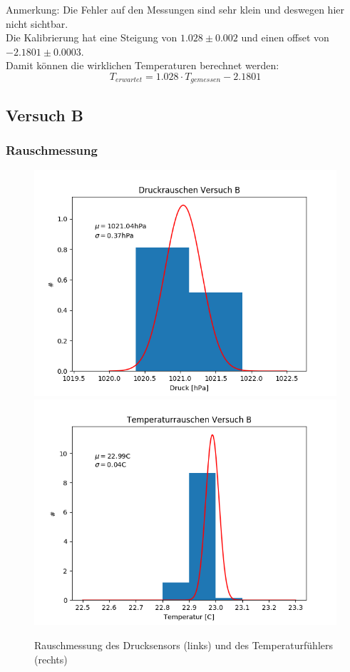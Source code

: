 \documentclass[12pt,a4paper]{article}
\begin{document}
Anmerkung: Die Fehler auf den Messungen sind sehr klein und deswegen hier nicht sichtbar.\\
Die Kalibrierung hat eine Steigung von $1.028\pm 0.002$ und einen offset von $-2.1801\pm 0.0003$.\\
Damit können die wirklichen Temperaturen berechnet werden:
\begin{equation}
T_{erwartet}=1.028\cdot T_{gemessen}-2.1801
\end{equation}

\subsection{Versuch B}
\subsubsection{Rauschmessung}

\begin{figure}
\includegraphics[scale=0.5]{Bilder/DruckrauschenB}
\includegraphics[scale=0.5]{Bilder/TemprauschenB}
\caption[Rauschmessung Versuch B]{Rauschmessung des Drucksensors (links) und des Temperaturfühlers (rechts)}
\label{fig:RauschenB}
\end{figure}
\end{document}
